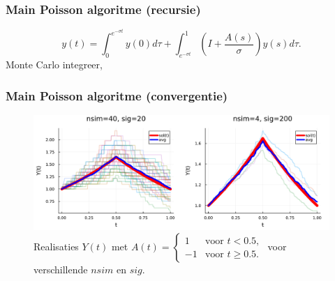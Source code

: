 \documentclass[18pt,aspectratio=149]{beamer}
\begin{document}
\begin{frame}
    \frametitle{Main Poisson algoritme (recursie)}

    \begin{equation} \label{eq:poisson main 2}
        y(t) = \int_{0}^{e^{-\sigma t}}  y(0) d\tau
        + \int_{e^{-\sigma t}}^{1} \left(I+   \frac{A(s)}{\sigma} \right)  y(s) d\tau.
    \end{equation}
    Monte Carlo integreer,  \\
    \action<+->{}
\end{frame}


\begin{frame}
    \frametitle{Main Poisson algoritme (convergentie)}
    \begin{figure}[h!]
        \centering
        \includegraphics[width=\textwidth]{imgs/convergence_main_poisson.pdf}
        \caption{
            Realisaties $Y(t)$ met $A(t) = \begin{cases}
                    1  & \text{voor } t < 0.5,    \\
                    -1 & \text{voor } t \geq 0.5.
                \end{cases}$ voor verschillende $nsim$ en $sig$.
        }
        \label{fig:imgs/main poisson convergentie}
    \end{figure}
\end{frame}
\end{document}
